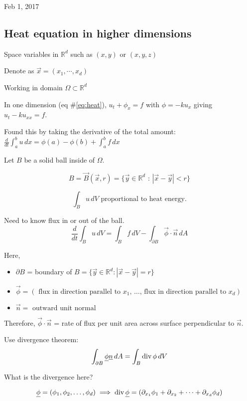 \documentclass[main.tex]{subfiles}
\begin{document}
\hrulefill{}

Feb 1, 2017

\vspace{3mm}

\subsection{Heat equation in higher dimensions}

Space variables in $\mathbb{R}^d$ such as $(x, y)$ or $(x, y, z)$

Denote as $\vec{x} = (x_1, \dotsb, x_d)$

Working in domain $\Omega \subset \mathbb{R}^d$

In one dimension (eq \#\ref{eq:heat}), $u_t + \phi_x = f$ with $\phi = -ku_x$ giving $u_t - ku_{xx} = f$.

Found this by taking the derivative of the total amount: $\frac{d}{dt}\int_a^b u\,dx = \phi(a) - \phi(b) + \int_a^b f\,dx$

Let $B$ be a solid ball inside of $\Omega$.

$$B = \vec{B}(\vec{x}, r) = \{\vec{y} \in \mathbb{R}^d \textrm{ : } \left|\vec{x} - \vec{y}\right| < r\}$$

$$\int_B u\,dV \textrm{ proportional to heat energy.}$$

Need to know flux in or out of the ball.
$$\frac{d}{dt}\int_B u\,dV = \int_B f\,dV - \int_{\partial B} \vec{\phi}\cdot \vec{n}\,dA$$

Here,
\begin{itemize}
    \item $\partial B$ = boundary of $B = \{\vec{y} \in \mathbb{R}^d : \left|\vec{x} - \vec{y}\right| = r\}$
    \item $\vec{\phi} = \left(\textrm{ flux in direction parallel to } x_1 \textrm{, \ldots, flux in direction parallel to } x_d\right)$
    \item $\vec{n} = \textrm{ outward unit normal}$
\end{itemize}

Therefore, $\vec{\phi}\cdot \vec{n}$ = rate of flux per unit area across surface perpendicular to $\vec{n}$.

Use divergence theorem:
$$\int_{\partial B} \underline{\phi} \underline{n}\,dA = \int_B \operatorname{div}{\phi}\, dV$$

What is the divergence here?

$$\underline{\phi} = \left(\phi_1, \phi_2, \ldots, \phi_d\right) \implies \operatorname{div}{\underline{\phi}} = \left(\partial_{x_1}\phi_1 + \partial_{x_2} + \cdots + \partial_{x_d}\phi_d\right)$$
\end{document}
